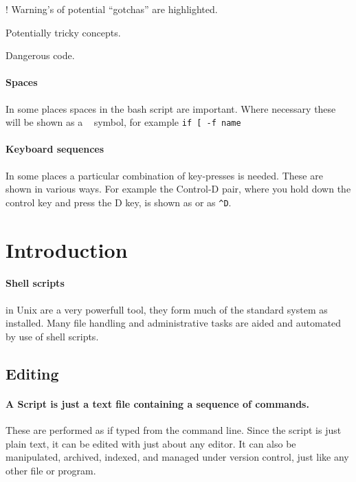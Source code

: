 \documentclass[12pt,a4paper]{article}
\begin{document}
\begin{note}{\Large !}
        Warning's of potential ``gotchas'' are
highlighted.
\end{note}

\begin{note}{\scriptsize\dbend}
        Potentially tricky concepts.
\end{note}

\begin{note}{\small\faWarning}
        Dangerous code.
\end{note}

\paragraph{Spaces} In some places spaces in the bash script are important.
Where necessary these will be shown as a \verb*| | symbol, for example
\verb*'if [ -f name'

\paragraph{Keyboard sequences} In some places a particular combination of
key-presses is needed.  These are shown in various ways.  For example the
Control-D pair, where you hold down the control key and press the D key, is
shown as  or as \verb'^D'.

\section{Introduction}
\paragraph{Shell scripts} in Unix are a very powerfull tool, they
form much of the standard system as installed.  Many file handling and
administrative tasks are aided and automated by use of shell scripts.

\subsection{Editing}
\paragraph{A Script is just a text file containing a sequence of
  commands.}  These are performed as if typed from the command line.
Since the script is just plain text, it can be edited with just about any
editor.  It can also be manipulated, archived, indexed, and managed under
version control,  just like any other file or program.
\end{document}
